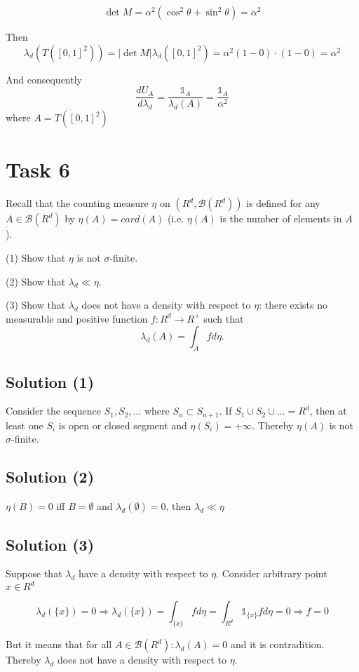 \documentclass{article}
\begin{document}
$$\det M = \alpha^2 (\cos^2 \theta + \sin^2 \theta) = \alpha^2$$

Then $$\lambda_d(T([0, 1]^2)) = |\det M|\lambda_d([0,1]^2) = \alpha^2 (1 - 0) \cdot (1 - 0) = \alpha^2$$

And consequently $$\frac{d U_A}{d \lambda_d} = \frac{\mathbb1_A}{\lambda_d(A)} = \frac{\mathbb1_A}{\alpha^2}$$ where $A = T([0, 1]^2)$

\section*{Task 6}

Recall that the counting measure $\eta$ on $(R^d, \mathcal B(R^d))$ is defined for any $A \in \mathcal B(R^d)$ by $\eta(A) = card(A)$ (i.e. $\eta(A)$ is the number of elements in $A$). 

(1) Show that $\eta$ is not $\sigma$-finite.

(2) Show that $\lambda_d \ll \eta$.

(3) Show that $\lambda_d$ does not have a density with respect to $\eta$: there exists no measurable and positive function $f : R^d \rightarrow R^+$ such that
$$\lambda_d(A)=\int_A f d\eta.$$

\subsection*{Solution (1)}

Consider the sequence $S_1, S_2, \dots$ where $S_n \subset S_{n+1}$. If $S_1 \cup S_2 \cup \dots = R^d$, then at least one $S_i$ is open or closed segment and $\eta(S_i) = +\infty$. Thereby $\eta(A)$ is not $\sigma$-finite.

\subsection*{Solution (2)}

$\eta(B) = 0$ iff $B = \emptyset$ and $\lambda_d(\emptyset)=0$, then $\lambda_d \ll \eta$

\subsection*{Solution (3)}

Suppose that $\lambda_d$ have a density with respect to $\eta$. Consider arbitrary point $x \in R^d$

$$\lambda_d(\{x\}) = 0 \Rightarrow \lambda_d(\{x\}) = \int_{\{x\}}fd\eta = \int_{R^d}\mathbb 1_{\{x\}} f d\eta = 0 \Rightarrow f = 0$$ 

But it means that for all $A \in \mathcal B(R^d): \lambda_d(A) = 0$
and it is contradition. Thereby $\lambda_d$ does not have a density with respect to $\eta$.
\end{document}
